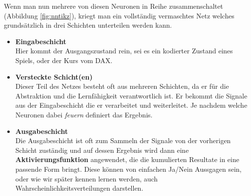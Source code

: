             \noindent
            Wenn man nun mehrere von diesen Neuronen in Reihe zusammenschaltet (Abbildung \ref{fig:nntikz}), kriegt man ein vollständig vermaschtes Netz welches grundsätzlich in drei Schichten unterteilen werden kann.
            \begin{itemize}
                \setlength{\itemsep}{5pt}
                \item \textbf{Eingabeschicht} \\
                    Hier kommt der Ausgangszustand rein, sei es ein kodierter Zustand eines Spiels, oder der Kurs vom DAX.
                \item \textbf{Versteckte Schicht(en)} \\
                    Dieser Teil des Netzes besteht oft aus mehreren Schichten, da er für die Abstraktion und die Lernfähigkeit verantwortlich ist.\cite{ANNModeling} Er bekommt die Signale aus der Eingabeschicht die er verarbeitet und weiterleitet. Je nachdem welche Neuronen dabei \textit{feuern} definiert das Ergebnis.
                \item \textbf{Ausgabeschicht} \\
                    Die Ausgabeschicht ist oft zum Sammeln der Signale von der vorherigen Schicht zuständig und auf dessen Ergebnis wird dann eine \textbf{Aktivierungsfunktion} angewendet, die die kumulierten Resultate in eine passende Form bringt. Diese können von einfachen Ja/Nein Aussgagen sein, oder wie wir später kennen lernen werden, auch Wahrscheinlichkeitsverteilungen darstellen.

            \end{itemize}



